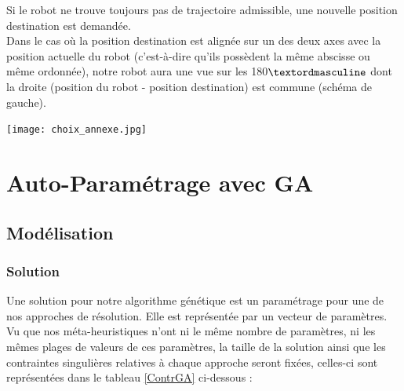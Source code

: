 Si le robot ne trouve toujours pas de trajectoire admissible, une nouvelle position destination est demandée.\\

Dans le cas où la position destination est alignée sur un des deux axes avec la position actuelle du robot (c'est-à-dire qu'ils possèdent la même abscisse ou même ordonnée), notre robot aura une vue sur les 180$\textordmasculine$ dont la droite (position du robot - position destination) est commune (schéma de gauche).
\noindent
\begin{center}	  
	\texttt{[image: choix\_annexe.jpg]}%
	\vspace{-0.1 cm}
	\label{choix_annexe}%
\end{center}


\section{Auto-Paramétrage avec GA}
\label{génétique}
\subsection{Modélisation}
\subsubsection{Solution}
Une solution pour notre algorithme génétique est un paramétrage pour une de nos approches de résolution. Elle est représentée par un vecteur de paramètres.\\
Vu que nos méta-heuristiques n'ont ni le même nombre de paramètres, ni les mêmes plages de valeurs de ces paramètres, la taille de la solution ainsi que les contraintes singulières relatives à chaque approche seront fixées, celles-ci sont représentées dans le tableau \ref{ContrGA} ci-dessous :

